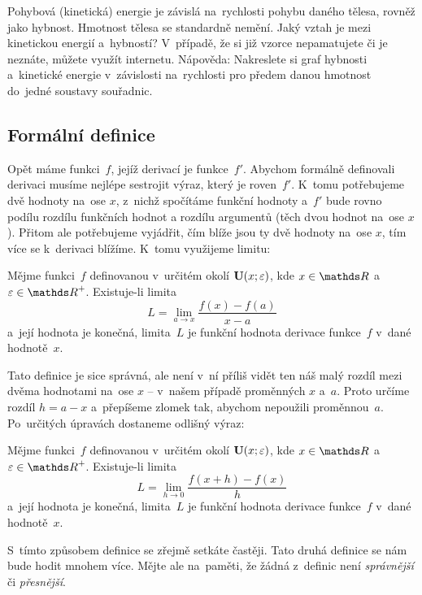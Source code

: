 \begin{exercise}
    Pohybová (kinetická) energie je závislá na~rychlosti pohybu daného tělesa, rovněž
    jako hybnost. Hmotnost tělesa se standardně nemění. Jaký vztah je mezi kinetickou
    energií a~hybností? V~případě, že si již vzorce nepamatujete či je neznáte,
    můžete využít internetu. Nápověda: Nakreslete si graf hybnosti a~kinetické
    energie v~závislosti na~rychlosti pro předem danou hmotnost do~jedné soustavy
    souřadnic.
\end{exercise}

\subsection{Formální definice}
\label{subsec:derivace-definice-formal}

Opět máme funkci~$f$, jejíž derivací je funkce~$f'$. Abychom formálně definovali
derivaci musíme nejlépe sestrojit výraz, který je roven~$f'$. K~tomu potřebujeme dvě
hodnoty na~ose $x$, z~nichž spočítáme funkční hodnoty a~$f'$ bude rovno podílu
rozdílu funkčních hodnot a rozdílu argumentů (těch dvou hodnot na~ose $x$). Přitom
ale potřebujeme vyjádřit, čím blíže jsou ty dvě hodnoty na~ose $x$, tím více se
k~derivaci blížíme. K~tomu využijeme limitu:

\begin{definition}
    Mějme funkci~$f$ definovanou v~určitém okolí ${\mathbf{U}(x; \varepsilon)}$, kde
    ${x \in \reals}$ a~${\varepsilon \in \positive{\reals}}$.
    Existuje-li limita
    \begin{equation*}
        L = \lim_{a \to x} \frac{f(x) - f(a)}{x - a}
    \end{equation*}
    a~její hodnota je konečná, limita~$L$ je funkční hodnota derivace funkce~$f$
    v~dané hodnotě~$x$.
\end{definition}

Tato definice je sice správná, ale není v~ní příliš vidět ten náš malý rozdíl mezi
dvěma hodnotami na~ose $x$ -- v~našem případě proměnných $x$ a~$a$. Proto určíme
rozdíl $h = a - x$ a~přepíšeme zlomek tak, abychom nepoužili proměnnou~$a$.
Po~určitých úpravách dostaneme odlišný výraz:

\begin{definition}
    Mějme funkci~$f$ definovanou v~určitém okolí ${\mathbf{U}(x; \varepsilon)}$, kde
    ${x \in \reals}$ a~${\varepsilon \in \positive{\reals}}$.
    Existuje-li limita
    \begin{equation*}
        L = \lim_{h \to 0} \frac{f(x + h) - f(x)}{h}
    \end{equation*}
    a~její hodnota je konečná, limita~$L$ je funkční hodnota derivace funkce~$f$
    v~dané hodnotě~$x$.
\end{definition}

S~tímto způsobem definice se zřejmě setkáte častěji.
Tato druhá definice se nám bude hodit mnohem více.
Mějte ale na~paměti, že žádná z~definic není \emph{správnější} či \emph{přesnější}.
